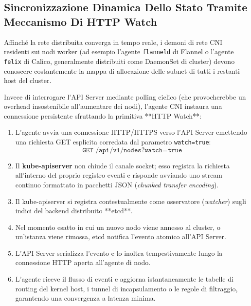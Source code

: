 \documentclass[11pt, a4paper]{article}
\begin{document}
\subsection{Sincronizzazione Dinamica Dello Stato Tramite Meccanismo Di HTTP Watch}

Affinché la rete distribuita converga in tempo reale, i demoni di rete CNI residenti sui nodi worker (ad esempio l'agente \texttt{flanneld} di Flannel o l'agente \texttt{felix} di Calico, generalmente distribuiti come DaemonSet di cluster) devono conoscere costantemente la mappa di allocazione delle subnet di tutti i restanti host del cluster.

Invece di interrogare l'API Server mediante polling ciclico (che provocherebbe un overhead insostenibile all'aumentare dei nodi), l'agente CNI instaura una connessione persistente sfruttando la primitiva **HTTP Watch**:

\begin{enumerate}
    \item L'agente avvia una connessione HTTP/HTTPS verso l'API Server emettendo una richiesta GET esplicita corredata dal parametro \texttt{watch=true}:
    \[
    \texttt{GET /api/v1/nodes?watch=true}
    \]
    \item Il \textbf{kube-apiserver} non chiude il canale socket; esso registra la richiesta all'interno del proprio registro eventi e risponde avviando uno stream continuo formattato in pacchetti JSON (\emph{chunked transfer encoding}).
    \item Il kube-apiserver si registra contestualmente come osservatore (\emph{watcher}) sugli indici del backend distribuito **etcd**.
    \item Nel momento esatto in cui un nuovo nodo viene annesso al cluster, o un'istanza viene rimossa, etcd notifica l'evento atomico all'API Server.
    \item L'API Server serializza l'evento e lo inoltra tempestivamente lungo la connessione HTTP aperta all'agente di nodo.
    \item L'agente riceve il flusso di eventi e aggiorna istantaneamente le tabelle di routing del kernel host, i tunnel di incapsulamento o le regole di filtraggio, garantendo una convergenza a latenza minima.
\end{enumerate}

\newpage

\end{document}
